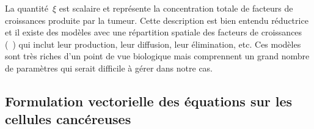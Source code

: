 \documentclass[main.tex]{subfiles}
\begin{document}
\bigskip
La quantité~$\xi$ est scalaire et représente la concentration totale de facteurs de croissances %
produite par la tumeur. Cette description est bien entendu réductrice et il existe des modèles avec une répartition spatiale des facteurs de croissances (\cf~\cite{Billy2009545}) qui inclut leur production, leur diffusion, leur élimination, etc. Ces modèles sont très riches d'un point de vue biologique mais comprennent un grand nombre de paramètres qui serait difficile à gérer dans notre cas. 

\subsection{Formulation vectorielle des équations sur les cellules cancéreuses}
\end{document}
